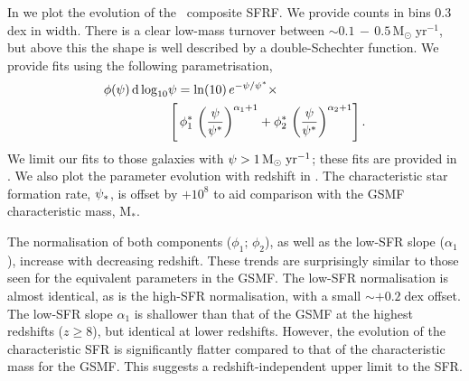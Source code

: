 In  we plot the evolution of the \flares\ composite SFRF.
We provide counts in bins 0.3 dex in width.
There is a clear low-mass turnover between $\sim 0.1\,-\,0.5 \, \mathrm{M_{\odot} \; yr^{-1}}$, but above this the shape is well described by a double-Schechter function.
We provide fits using the following parametrisation,
\begin{align}
    \phi(\psi) \, \mathrm{d}\log_{10}&\psi = \mathrm{ln}(10) \, e^{-\psi/\psi^*} \times \nonumber\\
    & \left[ \, \phi^{*}_{1} \, \left(\frac{\psi}{\psi^*} \right)^{\alpha_{1} + 1} + \phi^{*}_{2} \, \left(\frac{\psi}{\psi^*} \right)^{\alpha_{2} + 1} \right].
\end{align}
We limit our fits to those galaxies with $\psi > 1 \, \mathrm{M_{\odot} \; yr^{-1}}$; these fits are provided in .
We also plot the parameter evolution with redshift in .
The characteristic star formation rate, $\psi_*$, is offset by $+10^{8}$ to aid comparison with the GSMF characteristic mass, $\mathrm{M_{*}}$.

The normalisation of both components ($\phi_{1};\,\phi_{2}$), as well as the low-SFR slope ($\alpha_{1}$), increase with decreasing redshift.
These trends are surprisingly similar to those seen for the equivalent parameters in the GSMF.
The low-SFR normalisation is almost identical, as is the high-SFR normalisation, with a small $\sim +0.2\;\mathrm{dex}$ offset.
The low-SFR slope $\alpha_1$ is shallower than that of the GSMF at the highest redshifts ($z\geqslant 8$), but identical at lower redshifts.
However, the evolution of the characteristic SFR is significantly flatter compared to that of the characteristic mass for the GSMF.
This suggests a redshift-independent upper limit to the SFR.

